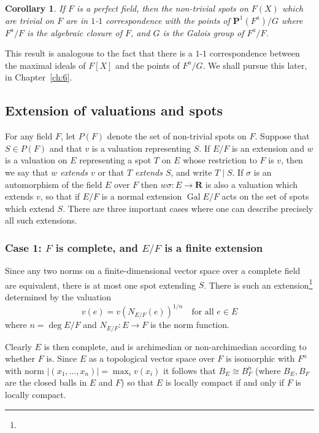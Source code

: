 \documentclass[10pt,leqno]{article}
\newtheorem{coro}[theo]{Corollary}
\theoremstyle{definition}
\def\RR{\mathbf{R}}
\def\PP{\mathbf{P}}
\DeclareMathOperator{\Gal}{Gal}
\def\fnfoon{}
\begin{document}
\begin{coro}
\label{4.1.11}
If $F$ is a perfect field, then the non-trivial spots on $F(X)$ which are trivial on $F$ are in $1$-$1$ correspondence with the points of $\PP^1(F^a)/G$ where $F^a/F$ is the algebraic closure of $F$, and $G$ is the Galois group of $F^a /F$.
\end{coro}


This result is analogous to the fact that there is a $1$-$1$ correspondence between the maximal ideals of $F[X]$ and the points of $F^a / G$.
We shall pursue this later, in Chapter~\ref{ch:6}.


\subsection{Extension of valuations and spots}
\label{ch:4.2}

For any field $F$, let $P(F)$ denote the set of non-trivial spots on $F$.
Suppose that $S \in P(F)$ and that $v$ is a valuation representing $S$.
If $E/F$ is an extension and $w$ is a valuation on $E$ representing a spot $T$ on $E$ whose restriction to $F$ is $v$, then we say that \emph{$w$ extends $v$} or that \emph{$T$ extends $S$}, and write $T \mid S$.
If $\sigma$ is an automorphism of the field $E$ over $F$ then $w\sigma : E \to \RR$ is also a valuation which extends $v$, so that if $E/F$ is a normal extension $\Gal E/F$ acts on the set of spots which extend $S$.
There are three important cases where one can describe precisely all such extensions.


\subsubsection[Case 1]{Case 1: $F$ is complete, and $E/F$ is a finite extension}
\label{4.2.1}

Since any two norms on a finite-dimensional vector space over a complete field are equivalent, there is at most one spot extending $S$.
There is such an extension\footnote{\fnfoon} determined by the valuation
\[
v(e) = v(N_{E/F}(e))^{1/n}
\quad
\text{for all $e \in E$}
\]
where $n = \deg E/F$ and $N_{E/F} : E \to F$ is the norm function.

Clearly $E$ is then complete, and is archimedian or non-archimedian according to whether $F$ is.
Since $E$ as a topological vector space over $F$ is isomorphic with $F^n$ with norm $|(x_1, \ldots, x_n)| = \max_i v(x_i)$ it follows that $B_E \cong B_F^n$ (where $B_E, B_F$ are the closed balls in $E$ and $F$) so that $E$ is locally compact if and only if $F$ is locally compact.
\end{document}
